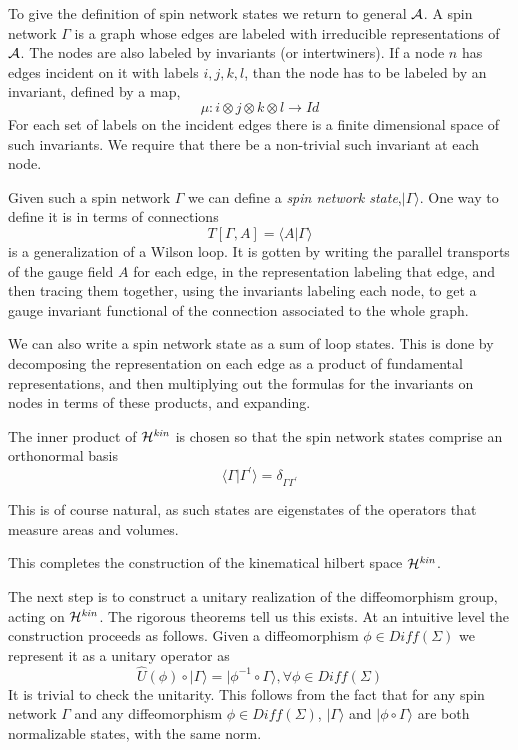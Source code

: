 \documentclass[12pt]{article}
\newcommand{\f}{\begin{equation}}
\newcommand{\ff}{\end{equation}}
\begin{document}
To give the definition of spin network states we return to general $\cal A$. 
A spin network $\Gamma$ is a graph whose edges are labeled with 
irreducible representations of $\cal A$.  The nodes are also labeled by 
invariants (or intertwiners). If a node $n$ has edges incident on it 
with labels $i,j,k,l$, than the node has to be labeled by an
invariant, defined by a map,
\f
\mu : i \otimes j \otimes k \otimes l \rightarrow Id
\ff
For each set of labels on the incident edges there is a finite 
dimensional space of such invariants. We require that there be a 
non-trivial such invariant at each node. 

Given such a spin network $\Gamma $ we can define a {\it spin network 
state},$ |\Gamma \rangle $.  One way to define it is in terms of connections
\f
T [\Gamma, A] = \langle A |\Gamma \rangle 
\ff
is a generalization of a Wilson 
loop. It is gotten by writing the parallel 
transports of the gauge field $A$ for each edge, in the representation
labeling that edge, and then tracing them together, using the 
invariants labeling each node, to get a gauge invariant functional of 
the connection associated to the whole graph.  

We can also write a spin network state as a sum  of loop
states. This is done by decomposing the representation on each edge
as a product of fundamental representations, and then multiplying out
the formulas for the invariants on nodes in terms of these products, 
and expanding.  

The inner product of ${\cal H}^{\it kin}$ is chosen so that the spin network states 
comprise an orthonormal basis
\f
\langle\Gamma |\Gamma^\prime \rangle = \delta_{\Gamma \Gamma^\prime}
\ff

This is of course natural, as such states are eigenstates of the operators 
that measure areas and
volumes.

This completes the construction of the kinematical hilbert space
${\cal H}^{\it kin}$.  

The next step is to construct  a unitary realization of the diffeomorphism group, 
acting on ${\cal H}^{\it kin}$.  The rigorous theorems tell us this exists.
At an intuitive level the construction proceeds as follows.   
Given a diffeomorphism $\phi \in Diff (\Sigma )$  we represent it as
a unitary operator as
\f
\hat{U}(\phi ) \circ |\Gamma \rangle = |\phi^{-1} \circ \Gamma \rangle,  \forall \phi \in Diff( \Sigma ) 
\ff
It is trivial to check the unitarity. This follows from the fact that for any spin network
$\Gamma$ and any diffeomorphism $\phi \in Diff( \Sigma )$,  $|\Gamma \rangle$ and
$| \phi \circ \Gamma \rangle$ are both normalizable states, with the same norm.   
\end{document}
